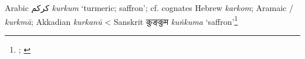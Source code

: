 \begin{etymology}\label{ety:kurkum}
Arabic {كركم} \textit{kurkum} `turmeric; saffron'; cf. cognates Hebrew  \textit{karkom}; Aramaic / \textit{kurkmā}; Akkadian  \textit{kurkanū}
< Sanskrit {कुङ्कुम } \textit{kuṅkuma} `saffron'\footnote{\textcite[kwrkm]{cal}; \textcite{guthrie_trade-language_2009}}
\end{etymology}